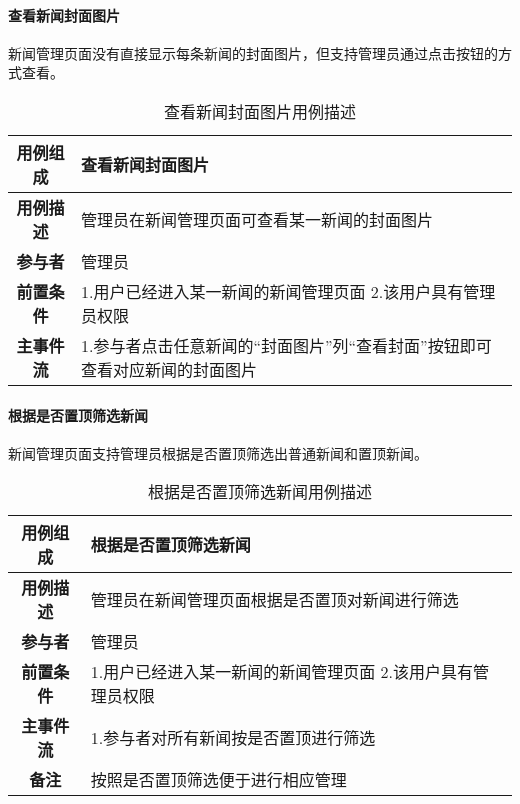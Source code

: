 \paragraph{查看新闻封面图片}

新闻管理页面没有直接显示每条新闻的封面图片，但支持管理员通过点击按钮的方式查看。\\

\begin{table}[H]
	\centering
	\caption{查看新闻封面图片用例描述}
	\renewcommand\arraystretch{1.5}
	\begin{tabular}{|c|>{\raggedright\arraybackslash}p{10cm}|}
		\hline
		\textbf{用例组成} & \textbf{查看新闻封面图片}\\
		\hline
		\textbf{用例描述} & 管理员在新闻管理页面可查看某一新闻的封面图片\\ 
		\hline
		\textbf{参与者} & 管理员\\
		\hline
		\textbf{前置条件} & 
		1.用户已经进入某一新闻的新闻管理页面\newline
		2.该用户具有管理员权限\\
		\hline
		\textbf{主事件流} & 
		1.参与者点击任意新闻的“封面图片”列“查看封面”按钮即可查看对应新闻的封面图片\\
		\hline
	\end{tabular}
\end{table}

\paragraph{根据是否置顶筛选新闻}

新闻管理页面支持管理员根据是否置顶筛选出普通新闻和置顶新闻。\\

\begin{table}[H]
	\centering
	\caption{根据是否置顶筛选新闻用例描述}
	\renewcommand\arraystretch{1.5}
	\begin{tabular}{|c|>{\raggedright\arraybackslash}p{10cm}|}
		\hline
		\textbf{用例组成} & \textbf{根据是否置顶筛选新闻}\\
		\hline
		\textbf{用例描述} & 管理员在新闻管理页面根据是否置顶对新闻进行筛选\\ 
		\hline
		\textbf{参与者} & 管理员\\
		\hline
		\textbf{前置条件} & 
		1.用户已经进入某一新闻的新闻管理页面\newline
		2.该用户具有管理员权限\\
		\hline
		\textbf{主事件流} & 
		1.参与者对所有新闻按是否置顶进行筛选\\
		\hline
		\textbf{备注} & 按照是否置顶筛选便于进行相应管理\\
		\hline
	\end{tabular}
\end{table}

